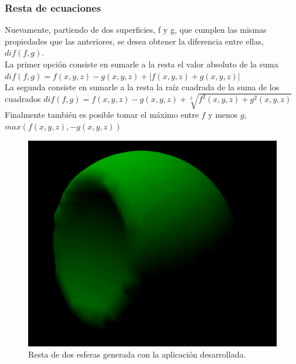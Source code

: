 \documentclass[12pt]{article}
\begin{document}
\subsubsection{Resta de ecuaciones}
Nuevamente, partiendo de dos superficies, f y g, que cumplen las mismas propiedades que las anteriores, se desea obtener la diferencia entre ellas, $dif(f,g)$.
\\La primer opción consiste en sumarle a la resta el valor absoluto de la suma $dif(f,g) = f(x,y,z) - g(x,y,z) + |f(x,y,z) + g(x,y,z)|$
\\La segunda consiste en sumarle a la resta la raíz cuadrada de la suma de los cuadrados $dif(f,g) = f(x,y,z) - g(x,y,z) + \sqrt[2]{f^2(x,y,z) + g^2(x,y,z)}$ 
\\Finalmente también es posible tomar el máximo entre $f$ y menos $g$, $max(f(x,y,z),-g(x,y,z))$
\begin{figure}[h]
\includegraphics[width=\linewidth,center]{oi3.png}
\caption{Resta de dos esferas generada con la aplicación desarrollada.}
\end{figure}
\clearpage
\end{document}
